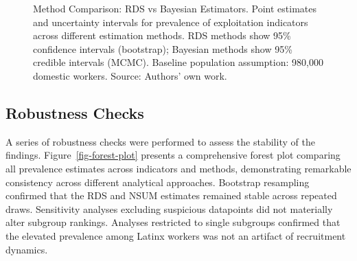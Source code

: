 \documentclass[
  12pt,
  letterpaper,
  DIV=11,
  numbers=noendperiod]{scrartcl}
\theoremstyle{plain}
\theoremstyle{definition}
\begin{document}
\begin{figure}[H]


\caption{\label{fig-method-comparison}Method Comparison: RDS vs Bayesian
Estimators. Point estimates and uncertainty intervals for prevalence of
exploitation indicators across different estimation methods. RDS methods
show 95\% confidence intervals (bootstrap); Bayesian methods show 95\%
credible intervals (MCMC). Baseline population assumption: 980,000
domestic workers. Source: Authors' own work.}

\end{figure}%

\subsection{Robustness Checks}\label{robustness-checks}

A series of robustness checks were performed to assess the stability of
the findings. Figure~\ref{fig-forest-plot} presents a comprehensive
forest plot comparing all prevalence estimates across indicators and
methods, demonstrating remarkable consistency across different
analytical approaches. Bootstrap resampling confirmed that the RDS and
NSUM estimates remained stable across repeated draws. Sensitivity
analyses excluding suspicious datapoints did not materially alter
subgroup rankings. Analyses restricted to single subgroups confirmed
that the elevated prevalence among Latinx workers was not an artifact of
recruitment dynamics.
\end{document}

